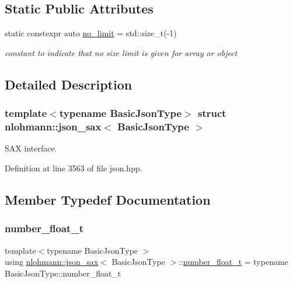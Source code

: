 \subsection*{Static Public Attributes}
\begin{DoxyCompactItemize}
\item 
static constexpr auto \hyperlink{structnlohmann_1_1json__sax_a84031c6bbd5b85ec13da024fe9e2b9c9}{no\+\_\+limit} = std\+::size\+\_\+t(-\/1)
\begin{DoxyCompactList}\small\item\em constant to indicate that no size limit is given for array or object \end{DoxyCompactList}\end{DoxyCompactItemize}


\subsection{Detailed Description}
\subsubsection*{template$<$typename Basic\+Json\+Type$>$\newline
struct nlohmann\+::json\+\_\+sax$<$ Basic\+Json\+Type $>$}

S\+AX interface. 

Definition at line 3563 of file json.\+hpp.



\subsection{Member Typedef Documentation}
\mbox{\label{structnlohmann_1_1json__sax_a390c209bffd8c4800c8f3076dc465a20}} 
\subsubsection{\texorpdfstring{number\+\_\+float\+\_\+t}{number\_float\_t}}
{\footnotesize\ttfamily template$<$typename Basic\+Json\+Type $>$ \\
using \hyperlink{structnlohmann_1_1json__sax}{nlohmann\+::json\+\_\+sax}$<$ Basic\+Json\+Type $>$\+::\hyperlink{structnlohmann_1_1json__sax_a390c209bffd8c4800c8f3076dc465a20}{number\+\_\+float\+\_\+t} =  typename Basic\+Json\+Type\+::number\+\_\+float\+\_\+t}



